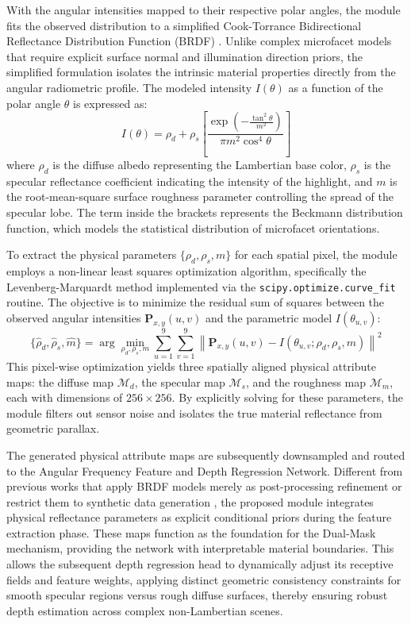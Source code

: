 \documentclass[lettersize,journal]{IEEEtran}
\begin{document}
With the angular intensities mapped to their respective polar angles, the module fits the observed distribution to a simplified Cook-Torrance Bidirectional Reflectance Distribution Function (BRDF) \cite{blinn1977}. Unlike complex microfacet models that require explicit surface normal and illumination direction priors, the simplified formulation isolates the intrinsic material properties directly from the angular radiometric profile. The modeled intensity $I(\theta)$ as a function of the polar angle $\theta$ is expressed as:
\begin{equation}
I(\theta) = \rho_d + \rho_s \left[ \frac{\exp\left(-\frac{\tan^2\theta}{m^2}\right)}{\pi m^2 \cos^4\theta} \right]
\end{equation}
where $\rho_d$ is the diffuse albedo representing the Lambertian base color, $\rho_s$ is the specular reflectance coefficient indicating the intensity of the highlight, and $m$ is the root-mean-square surface roughness parameter controlling the spread of the specular lobe. The term inside the brackets represents the Beckmann distribution function, which models the statistical distribution of microfacet orientations.

To extract the physical parameters $\{\rho_d, \rho_s, m\}$ for each spatial pixel, the module employs a non-linear least squares optimization algorithm, specifically the Levenberg-Marquardt method implemented via the \texttt{scipy.optimize.curve\_fit} routine. The objective is to minimize the residual sum of squares between the observed angular intensities $\mathbf{P}_{x,y}(u,v)$ and the parametric model $I(\theta_{u,v})$:
\begin{equation}
\{\hat{\rho}_d, \hat{\rho}_s, \hat{m}\} = \arg\min_{\rho_d, \rho_s, m} \sum_{u=1}^{9} \sum_{v=1}^{9} \left\| \mathbf{P}_{x,y}(u,v) - I(\theta_{u,v}; \rho_d, \rho_s, m) \right\|^2
\end{equation}
This pixel-wise optimization yields three spatially aligned physical attribute maps: the diffuse map $\mathcal{M}_d$, the specular map $\mathcal{M}_s$, and the roughness map $\mathcal{M}_m$, each with dimensions of $256 \times 256$. By explicitly solving for these parameters, the module filters out sensor noise and isolates the true material reflectance from geometric parallax.

The generated physical attribute maps are subsequently downsampled and routed to the Angular Frequency Feature and Depth Regression Network. Different from previous works that apply BRDF models merely as post-processing refinement \cite{li2021} or restrict them to synthetic data generation \cite{zhang2023}, the proposed module integrates physical reflectance parameters as explicit conditional priors during the feature extraction phase. These maps function as the foundation for the Dual-Mask mechanism, providing the network with interpretable material boundaries. This allows the subsequent depth regression head to dynamically adjust its receptive fields and feature weights, applying distinct geometric consistency constraints for smooth specular regions versus rough diffuse surfaces, thereby ensuring robust depth estimation across complex non-Lambertian scenes.
\end{document}
